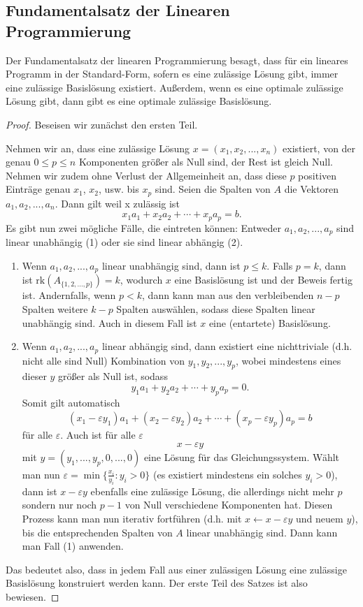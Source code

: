 \documentclass{article}
\begin{document}
\subsection{Fundamentalsatz der Linearen Programmierung}
Der Fundamentalsatz der linearen Programmierung besagt, dass für ein lineares Programm in der Standard-Form, sofern es eine zulässige Lösung gibt, immer eine zulässige Basislösung existiert. Außerdem, wenn es eine optimale zulässige Lösung gibt, dann gibt es eine optimale zulässige Basislösung.
\begin{proof} 
    Beseisen wir zunächst den ersten Teil. 
    
    Nehmen wir an, dass eine zulässige Lösung \(x=(x_1, x_2, ..., x_n)\) existiert, von der genau \(0\leq p\leq n\) Komponenten größer als Null sind, der Rest ist gleich Null. Nehmen wir zudem ohne Verlust der Allgemeinheit an, dass diese \(p\) positiven Einträge genau \(x_1\), \(x_2\), usw. bis \(x_p\) sind. Seien die Spalten von \(A\) die Vektoren \(a_1,a_2,...,a_n\). Dann gilt weil x zulässig ist\[
    x_1a_1+x_2a_2+\cdots+x_pa_p=b.
    \]
    Es gibt nun zwei mögliche Fälle, die eintreten können: Entweder \(a_1, a_2, ..., a_p\) sind linear unabhängig (1) oder sie sind linear abhängig (2).
    \begin{enumerate}
        \item Wenn \(a_1, a_2, ..., a_p\) linear unabhängig sind, dann ist \(p\leq k\). Falls \(p=k\), dann ist \(\text{rk}(A_{\{1,2,...,p\}})=k\), wodurch \(x\) eine Basislösung ist und der Beweis fertig ist. Andernfalls, wenn \(p<k\), dann kann man aus den verbleibenden \(n-p\) Spalten weitere \(k-p\) Spalten auswählen, sodass diese Spalten linear unabhängig sind. Auch in diesem Fall ist \(x\) eine (entartete) Basislösung.
        \item Wenn \(a_1, a_2, ..., a_p\) linear abhängig sind, dann existiert eine nichttriviale (d.h. nicht alle sind Null) Kombination von \(y_1, y_2,...,y_p\), wobei mindestens eines dieser \(y\) größer als Null ist, sodass
        \[
        y_1a_1+y_2a_2+\cdots+y_pa_p=0.
        \]
        Somit gilt automatisch 
        \[
        (x_1-\varepsilon y_1)a_1+(x_2-\varepsilon y_2)a_2+\cdots+(x_p-\varepsilon y_p)a_p=b
        \] für alle \(\varepsilon\). Auch ist für alle \(\varepsilon\)\[
        x-\varepsilon y 
        \]mit \(y=(y_1,...,y_p,0,...,0)\) eine Lösung für das Gleichungssystem. Wählt man nun \(\varepsilon=\min\{\frac{x_i}{y_i}:y_i>0\}\) (es existiert mindestens ein solches \(y_i>0\)), dann ist \(x-\varepsilon y\) ebenfalls eine zulässige Lösung, die allerdings nicht mehr \(p\) sondern nur noch \(p-1\) von Null verschiedene Komponenten hat. Diesen Prozess kann man nun iterativ fortführen (d.h. mit \(x\leftarrow x-\varepsilon y\) und neuem \(y\)), bis die entsprechenden Spalten von \(A\) linear unabhängig sind. Dann kann man Fall (1) anwenden.
    \end{enumerate}
    Das bedeutet also, dass in jedem Fall aus einer zulässigen Lösung eine zulässige Basislösung konstruiert werden kann. Der erste Teil des Satzes ist also bewiesen.


\end{proof}
\end{document}
